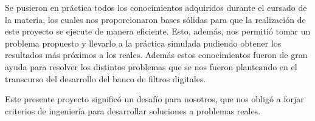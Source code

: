 Se pusieron en práctica todos los conocimientos adquiridos durante el cursado de la materia, los cuales nos proporcionaron bases sólidas para que la realización de este proyecto se ejecute de manera eficiente. Esto, además, nos permitió tomar un problema propuesto y llevarlo a la práctica simulada pudiendo obtener los resultados más próximos a los reales. Además estos conocimientos fueron de gran ayuda para resolver los distintos problemas que se nos fueron planteando en el transcurso del desarrollo del banco de filtros digitales.

Este presente proyecto significó un desafío para nosotros, que nos obligó a forjar criterios de ingeniería para desarrollar soluciones a problemas reales.